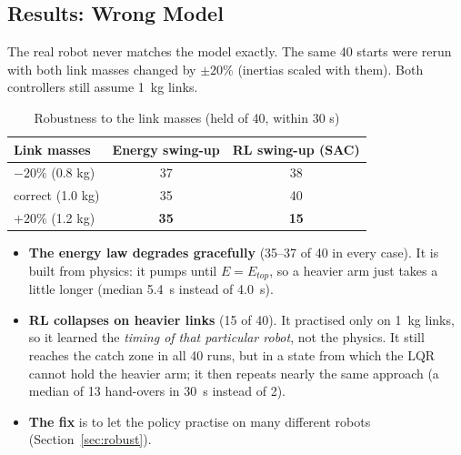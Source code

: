 \subsection{Results: Wrong Model}
The real robot never matches the model exactly. The same 40 starts were rerun with both link masses changed by $\pm20\%$ (inertias scaled with them). Both controllers still assume 1~kg links.
\begin{table}[H]
\centering
\caption{Robustness to the link masses (held of 40, within 30 s)}
\label{tab:rlrob}
\begin{tabular}{|l|c|c|}
\hline
Link masses & Energy swing-up & RL swing-up (SAC)\\ \hline
$-20\%$ (0.8 kg) & 37 & 38\\
correct (1.0 kg) & 35 & 40\\
$+20\%$ (1.2 kg) & \textbf{35} & \textbf{15}\\ \hline
\end{tabular}
\end{table}
\begin{itemize}
\item \textbf{The energy law degrades gracefully} (35--37 of 40 in every case). It is built from physics: it pumps until $E=E_{top}$, so a heavier arm just takes a little longer (median 5.4~s instead of 4.0~s).
\item \textbf{RL collapses on heavier links} (15 of 40). It practised only on 1~kg links, so it learned the \emph{timing of that particular robot}, not the physics. It still reaches the catch zone in all 40 runs, but in a state from which the LQR cannot hold the heavier arm; it then repeats nearly the same approach (a median of 13 hand-overs in 30~s instead of 2).
\item \textbf{The fix} is to let the policy practise on many different robots (Section~\ref{sec:robust}).
\end{itemize}

